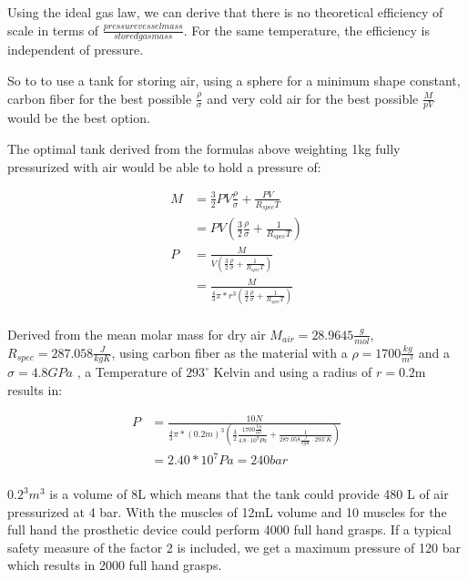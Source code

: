 \documentclass[main]{subfiles}
\begin{document}
Using the ideal gas law, we can derive that there is no theoretical efficiency of scale in terms of $\frac{pressure vessel mass}{stored gas mass}$. For the same temperature, the efficiency is independent of pressure.

So to to use a tank for storing air, using a sphere for a minimum shape constant, carbon fiber for the best possible $\frac{\rho}{\sigma}$ and very cold air for the best possible $\frac{M}{pV}$ would be the best option.

The optimal tank derived from the formulas above weighting 1kg fully pressurized with air would be able to hold a pressure of:

\begin{equation}
\label{eq:vesselstrength}
\begin{aligned}
M &= \frac{3}{2}PV\frac{\rho}{\sigma} + \frac{PV}{R_{spec}T}\\
&= PV(\frac{3}{2}\frac{\rho}{\sigma} + \frac{1}{R_{spec}T})\\
P &= \frac{M}{V(\frac{3}{2}\frac{\rho}{\sigma} + \frac{1}{R_{spec}T})}\\
&= \frac{M}{\frac{4}{3}\pi*r^3(\frac{3}{2}\frac{\rho}{\sigma} + \frac{1}{R_{spec}T})}\\
\end{aligned}
\end{equation}

Derived from the mean molar mass for dry air $M_{air} = 28.9645 \frac{g}{mol}$, $R_{spec} = 287.058 \frac{J}{kgK}$, using carbon fiber as the material with a $\rho =1700\frac{kg}{m^3}$ \cite{cfrhosigma} and a $\sigma = 4.8 GPa$ \cite{cfrhosigma}, a Temperature of $293^\circ$ Kelvin and using a radius of $r = 0.2$m results in:

\begin{equation}
\label{eq:final-vessel-strength}
\begin{aligned}
P &= \frac{10N}{\frac{4}{3}\pi*(0.2m)^3(\frac{3}{2}\frac{1700\frac{kg}{m^3}}{4.8 \cdot 10^9Pa} + \frac{1}{287.058 \frac{J}{kgK}\cdot 293^\circ K})}\\
&= 2.40 *10^7 Pa = 240 bar\\
\end{aligned}
\end{equation}

$0.2^3 m^3$ is a volume of 8L which means that the tank could provide 480 L of air pressurized at 4 bar. With the muscles of 12mL volume and 10 muscles for the full hand the prosthetic device could perform 4000 full hand grasps. If a typical safety measure of the factor 2 is included, we get a maximum pressure of 120 bar which results in 2000 full hand grasps.
\end{document}
